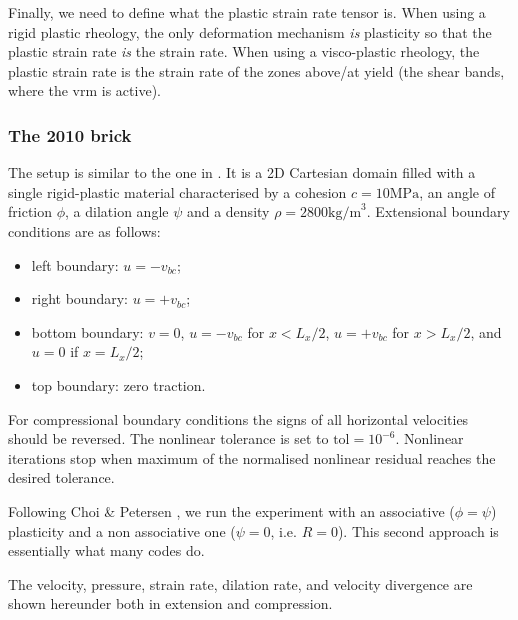Finally, we need to define what the plastic strain rate tensor is. When using a rigid plastic 
rheology, the only deformation mechanism {\it is} plasticity so that the plastic strain rate {\it is}
the strain rate. When using a visco-plastic rheology, the plastic strain rate is the strain rate 
of the zones above/at yield (the shear bands, where the vrm is active).
 
\subsubsection{The 2010 brick}

The setup is similar to the one in \cite{kaus10}. It is a 2D Cartesian domain filled with a 
single rigid-plastic material characterised by a cohesion $c=10\text{MPa}$, an 
angle of friction $\phi$, a dilation angle $\psi$ and a density $\rho=2800\text{kg/m}^3$.
Extensional boundary conditions are as follows: 
\begin{itemize}
\item left boundary: $u=- v_{bc}$;
\item right boundary: $u=+ v_{bc}$; 
\item bottom boundary: $v=0$, $u=- v_{bc}$ for $x<L_x/2$,  $u=+ v_{bc}$ for $x>L_x/2$, and $u=0$ if $x=L_x/2$;
\item top boundary: zero traction.
\end{itemize}
For compressional boundary conditions the signs of all horizontal velocities should be reversed.
The nonlinear tolerance is set to $\text{tol}=10^{-6}$. Nonlinear iterations stop when 
maximum of the normalised nonlinear residual reaches the desired tolerance.

Following Choi \& Petersen \cite{chpe15}, we run the experiment with an associative ($\phi=\psi$) plasticity
and a non associative one ($\psi=0$, i.e. $R=0$). This second approach is essentially what many codes 
do. 

The velocity, pressure, strain rate, dilation rate, and velocity divergence are shown hereunder both in 
extension and compression.

